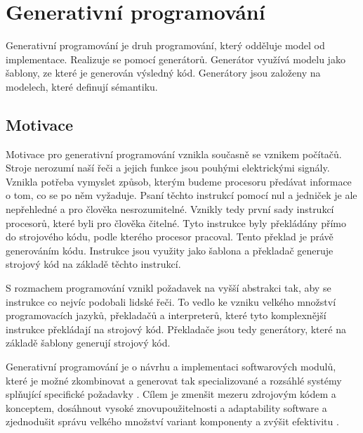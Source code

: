 \chapter{Generativní programování}
Generativní programování je druh programování, který odděluje model od implementace. Realizuje se pomocí generátorů. Generátor využívá modelu jako šablony, ze které je generován výsledný kód. Generátory jsou založeny na modelech, které definují sémantiku. 

\section{Motivace}
Motivace pro generativní programování vznikla současně se vznikem počítačů. Stroje nerozumí naší řeči a jejich funkce jsou pouhými elektrickými signály. Vznikla potřeba vymyslet způsob, kterým budeme procesoru předávat informace o tom, co se po něm vyžaduje. Psaní těchto instrukcí pomocí nul a jedniček je ale nepřehledné a pro člověka nesrozumitelné. Vznikly tedy první sady instrukcí procesorů, které byli pro člověka čitelné. Tyto instrukce byly překládány přímo do strojového kódu, podle kterého procesor pracoval. Tento překlad je právě generováním kódu. Instrukce jsou využity jako šablona a překladač generuje strojový kód na základě těchto instrukcí.

S rozmachem programování vznikl požadavek na vyšší abstrakci tak, aby se instrukce co nejvíc podobali lidské řeči. To vedlo ke vzniku velkého množství programovacích jazyků, překladačů a interpreterů, které tyto komplexnější instrukce překládají na strojový kód. Překladače jsou tedy generátory, které na základě šablony generují strojový kód. 

Generativní programování je o návrhu a implementaci softwarových modulů, které je možné zkombinovat a generovat tak specializované a rozsáhlé systémy splňující specifické požadavky \cite{Czarnecki98}. Cílem je zmenšit mezeru zdrojovým kódem a konceptem, dosáhnout vysoké znovupoužitelnosti a adaptability software a zjednodušit správu velkého množství variant komponenty a zvýšit efektivitu \cite{Ceg98}.

